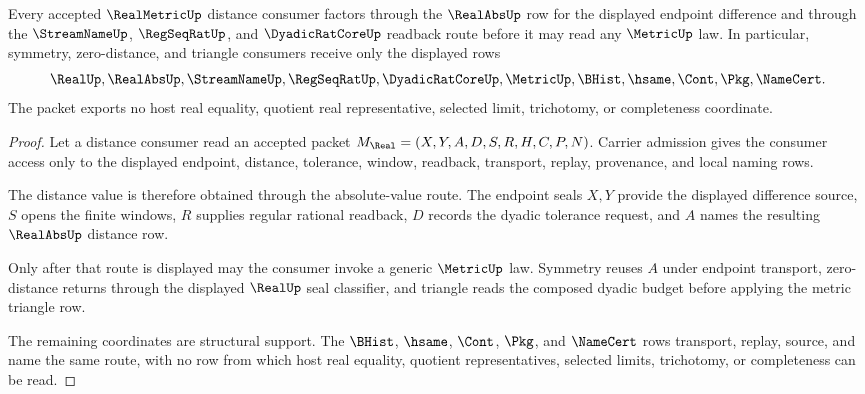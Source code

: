 \begin{theorem}
\label{thm:real-metric-absolute-value-distance-handoff}
Every accepted $\RealMetricUp$ distance consumer factors through the $\RealAbsUp$ row for the displayed endpoint difference and through the $\StreamNameUp$, $\RegSeqRatUp$, and $\DyadicRatCoreUp$ readback route before it may read any $\MetricUp$ law. In particular, symmetry, zero-distance, and triangle consumers receive only the displayed rows
$$
\RealUp,\RealAbsUp,\StreamNameUp,\RegSeqRatUp,\DyadicRatCoreUp,\MetricUp,\BHist,\hsame,\Cont,\Pkg,\NameCert .
$$
The packet exports no host real equality, quotient real representative, selected limit, trichotomy, or completeness coordinate.
\end{theorem}
\begin{proof}
Let a distance consumer read an accepted packet $M_{\Real}=(X,Y,A,D,S,R,H,C,P,N)$. Carrier admission gives the consumer access only to the displayed endpoint, distance, tolerance, window, readback, transport, replay, provenance, and local naming rows.

The distance value is therefore obtained through the absolute-value route. The endpoint seals $X,Y$ provide the displayed difference source, $S$ opens the finite windows, $R$ supplies regular rational readback, $D$ records the dyadic tolerance request, and $A$ names the resulting $\RealAbsUp$ distance row.

Only after that route is displayed may the consumer invoke a generic $\MetricUp$ law. Symmetry reuses $A$ under endpoint transport, zero-distance returns through the displayed $\RealUp$ seal classifier, and triangle reads the composed dyadic budget before applying the metric triangle row.

The remaining coordinates are structural support. The $\BHist$, $\hsame$, $\Cont$, $\Pkg$, and $\NameCert$ rows transport, replay, source, and name the same route, with no row from which host real equality, quotient representatives, selected limits, trichotomy, or completeness can be read.
\end{proof}

